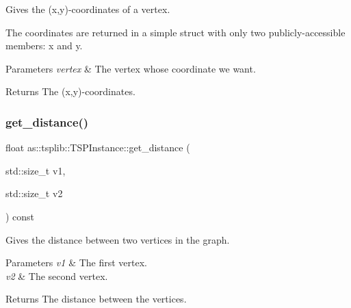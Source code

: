 Gives the (x,y)-\/coordinates of a vertex. 

The coordinates are returned in a simple struct with only two publicly-\/accessible members\+: x and y.


\begin{DoxyParams}{Parameters}
{\em vertex} & The vertex whose coordinate we want. \\
\hline
\end{DoxyParams}
\begin{DoxyReturn}{Returns}
The (x,y)-\/coordinates. 
\end{DoxyReturn}
\mbox{\label{classas_1_1tsplib_1_1TSPInstance_a52535b9ad72eaaac80f2a7a1518e680f}} 
\subsubsection{\texorpdfstring{get\+\_\+distance()}{get\_distance()}}
{\footnotesize\ttfamily float as\+::tsplib\+::\+T\+S\+P\+Instance\+::get\+\_\+distance (\begin{DoxyParamCaption}\item[{std\+::size\+\_\+t}]{v1,  }\item[{std\+::size\+\_\+t}]{v2 }\end{DoxyParamCaption}) const\hspace{0.3cm}{\ttfamily [inline]}}



Gives the distance between two vertices in the graph. 


\begin{DoxyParams}{Parameters}
{\em v1} & The first vertex. \\
\hline
{\em v2} & The second vertex. \\
\hline
\end{DoxyParams}
\begin{DoxyReturn}{Returns}
The distance between the vertices. 
\end{DoxyReturn}
\mbox{\label{classas_1_1tsplib_1_1TSPInstance_a9104ddf703ed589337edfbd44d7ffdf6}} 
